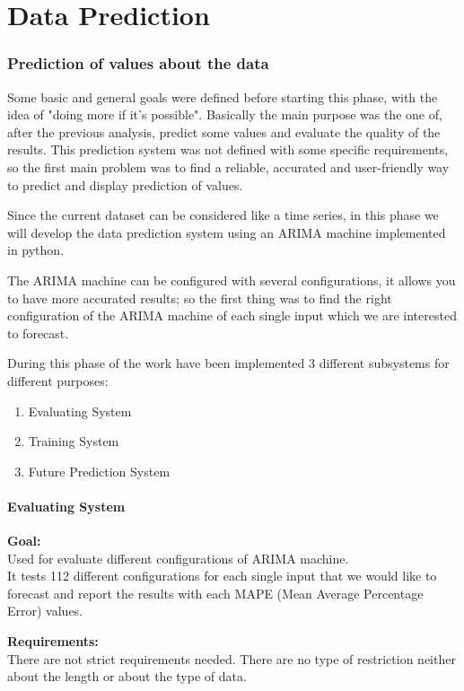 \part{Data Prediction}
\section{Prediction of values about the data}

Some basic and general goals were defined before starting this phase, with the idea of "doing more if it's possible". Basically the main purpose was the one of, after the previous analysis, predict some values and evaluate the quality of the results.
This prediction system was not defined with some specific requirements, so the first main problem was to find a reliable, accurated and user-friendly way to predict and display prediction of values.

Since the current dataset can be considered like a time series, in this phase we will develop the data prediction system using an ARIMA machine implemented in python.

The ARIMA machine can be configured with several configurations, it allows you to have more accurated results; so the first thing was to find the right configuration of the ARIMA machine of each single input which we are interested to forecast.

During this phase of the work have been implemented 3 different subsystems for different purposes:
\begin{enumerate}
\item Evaluating System
\item Training System
\item Future Prediction System
\end{enumerate}

\newpage
\subsection{Evaluating System}
\textbf{Goal:}\\ 
Used for evaluate different configurations of ARIMA machine. \\ 
It tests 112 different configurations for each single input that we would like to forecast and report the results with each MAPE (Mean Average Percentage Error) values.

\textbf{Requirements:}\\
There are not strict requirements needed. There are no type of restriction neither about the length or about the type of data.

